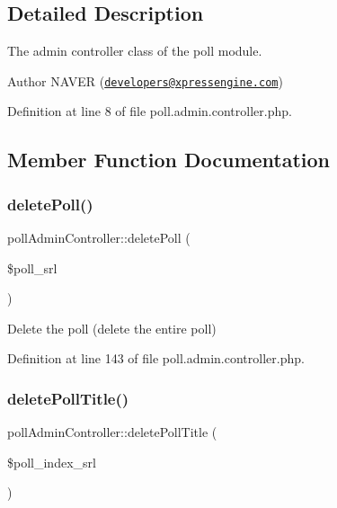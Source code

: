 \subsection{Detailed Description}
The admin controller class of the poll module. 

\begin{DoxyAuthor}{Author}
N\+A\+V\+ER (\href{mailto:developers@xpressengine.com}{\tt developers@xpressengine.\+com}) 
\end{DoxyAuthor}


Definition at line 8 of file poll.\+admin.\+controller.\+php.



\subsection{Member Function Documentation}
\hypertarget{classpollAdminController_ab8fa4ab256e902120f27dac1edea8f57}{}\label{classpollAdminController_ab8fa4ab256e902120f27dac1edea8f57} 
\subsubsection{\texorpdfstring{delete\+Poll()}{deletePoll()}}
{\footnotesize\ttfamily poll\+Admin\+Controller\+::delete\+Poll (\begin{DoxyParamCaption}\item[{}]{\$poll\+\_\+srl }\end{DoxyParamCaption})}



Delete the poll (delete the entire poll) 



Definition at line 143 of file poll.\+admin.\+controller.\+php.

\hypertarget{classpollAdminController_acd355746ff4a145b974b2a95b9c0eda9}{}\label{classpollAdminController_acd355746ff4a145b974b2a95b9c0eda9} 
\subsubsection{\texorpdfstring{delete\+Poll\+Title()}{deletePollTitle()}}
{\footnotesize\ttfamily poll\+Admin\+Controller\+::delete\+Poll\+Title (\begin{DoxyParamCaption}\item[{}]{\$poll\+\_\+index\+\_\+srl }\end{DoxyParamCaption})}



